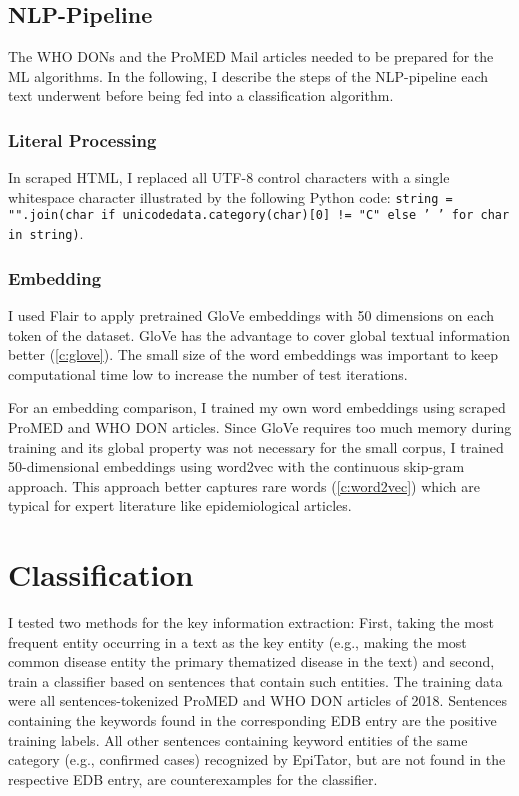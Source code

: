 \subsection{NLP-Pipeline}
  The WHO DONs and the ProMED Mail articles needed to be prepared for the ML algorithms.
  In the following, I describe the steps of the NLP-pipeline each text underwent before being fed into a classification algorithm.

\subsubsection{Literal Processing}
  In scraped HTML, I replaced all UTF-8 control characters with a single whitespace character illustrated by the following Python code: \texttt{string = "".join(char if unicodedata.category(char)[0] != "C" else ' ' for char in string)}.

\subsubsection{Embedding}
  I used Flair to apply pretrained GloVe embeddings with 50 dimensions on each token of the dataset. GloVe has the advantage to cover global textual information better (\ref{c:glove}). The small size of the word embeddings was important to keep computational time low to increase the number of test iterations.

  For an embedding comparison, I trained my own word embeddings using scraped ProMED and WHO DON articles.
  Since GloVe requires too much memory during training and its global property was not necessary for the small corpus, I trained 50-dimensional embeddings using word2vec with the continuous skip-gram approach.
  This approach better captures rare words (\ref{c:word2vec}) which are typical for expert literature like epidemiological articles.

\section{Classification}
  I tested two methods for the key information extraction: First, taking the most frequent entity occurring in a text as the key entity (e.g., making the most common disease entity the primary thematized disease in the text) and second, train a classifier based on sentences that contain such entities.
  The training data were all sentences-tokenized ProMED and WHO DON articles of 2018.
  Sentences containing the keywords found in the corresponding EDB entry are the positive training labels.
  All other sentences containing keyword entities of the same category (e.g., confirmed cases) recognized by EpiTator, but are not found in the respective EDB entry, are counterexamples for the classifier.

